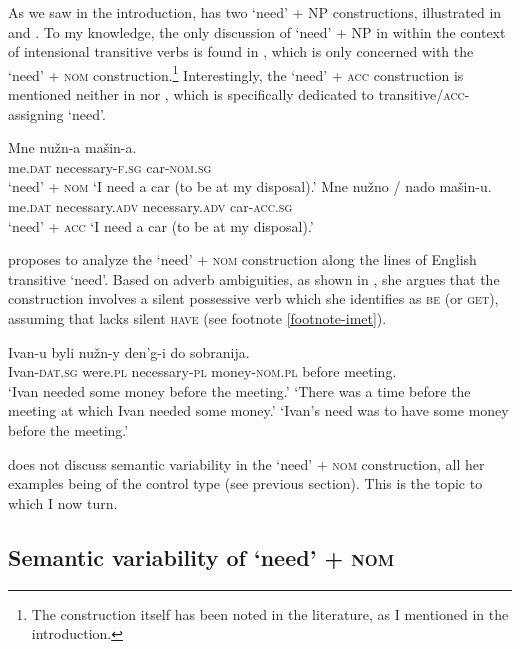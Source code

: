 \documentclass[output=paper,colorlinks,citecolor=brown]{langscibook}
\begin{document}
As we saw in the introduction,  has two `need' + NP constructions, illustrated in  and . To my knowledge, the only discussion of `need' + NP in  within the context of intensional transitive verbs is found in \citet{Harves2008}, which is only concerned with the `need' + \textsc{nom} construction.\footnote{The construction itself has been noted in the literature, as I mentioned in the introduction.} Interestingly, the `need' + \textsc{acc} construction is mentioned neither in \citet{Harves2008} nor \citet{Harves.Kayne2012}, which is specifically dedicated to transitive/\textsc{acc}-assigning `need'.

\ea
\ea \gll Mne nužn-a mašin-a.\\
     me.\textsc{dat} necessary-\textsc{f.sg} car-\textsc{nom.sg}\\ \hfill `need' + \textsc{nom}
\glt `I need a car (to be at my disposal).'\label{need-nom-rep}
\ex \gll Mne nužno / nado mašin-u.\\
     me.\textsc{dat} necessary.\textsc{adv} {} necessary.\textsc{adv} car-\textsc{acc.sg}\\ \hfill `need' + \textsc{acc}
\glt `I need a car (to be at my disposal).'\label{need-acc-rep}
\z \z

\noindent \citet{Harves2008} proposes to analyze the `need' + \textsc{nom} construction along the lines of English transitive `need'. Based on adverb ambiguities, as shown in , she argues that the construction involves a silent possessive verb which she identifies as \textsc{be} (or \textsc{get}), assuming that  lacks silent \textsc{have} (see footnote \ref{footnote-imet}).

\ea \gll Ivan-u byli nužn-y den'g-i do sobranija.\\
Ivan-\textsc{dat.sg} were.\textsc{pl} necessary-\textsc{pl} money-\textsc{nom.pl} before  meeting.\\
\glt `Ivan needed some money before the meeting.'
\ea `There was a time before the meeting at which Ivan needed some money.'
\ex `Ivan's need was to have some money before the meeting.'\\
\hfill \citep[216]{Harves2008}
\label{nuzhen-harves}
\z\z

\noindent \citet{Harves2008} does not discuss semantic variability in the `need' + \textsc{nom} construction, all her examples being of the control type (see previous section). This is the topic to which I now turn.

\subsection{Semantic variability of `need' + \textsc{nom}}\label{section-nom-variability}
\end{document}
